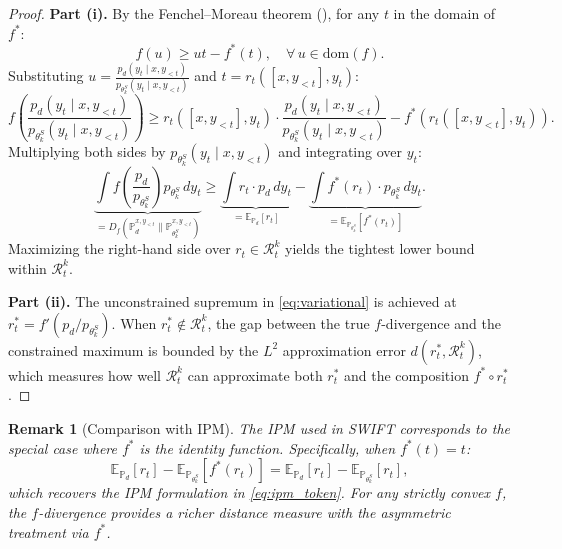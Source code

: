\documentclass[11pt,a4paper]{article}
\newtheorem{remark}[theorem]{Remark}
\newcommand{\Pd}{\mathbb{P}_d}
\newcommand{\E}{\mathbb{E}}
\newcommand{\Df}{D_f}
\begin{document}
\begin{proof}
\textbf{Part (i).} By the Fenchel--Moreau theorem (), for any $t$ in the domain of $f^*$:
\begin{equation}
    f(u) \geq ut - f^*(t), \quad \forall\, u \in \mathrm{dom}(f).
    \label{eq:fenchel_ineq}
\end{equation}
Substituting $u = \frac{p_d(y_t \mid x, y_{<t})}{p_{\theta^S_k}(y_t \mid x, y_{<t})}$ and $t = r_t([x, y_{<t}], y_t)$:
\[
    f\!\left(\frac{p_d(y_t \mid x, y_{<t})}{p_{\theta^S_k}(y_t \mid x, y_{<t})}\right) \geq r_t([x, y_{<t}], y_t) \cdot \frac{p_d(y_t \mid x, y_{<t})}{p_{\theta^S_k}(y_t \mid x, y_{<t})} - f^*\!\left(r_t([x, y_{<t}], y_t)\right).
\]
Multiplying both sides by $p_{\theta^S_k}(y_t \mid x, y_{<t})$ and integrating over $y_t$:
\[
    \underbrace{\int f\!\left(\frac{p_d}{p_{\theta^S_k}}\right) p_{\theta^S_k}\, dy_t}_{= \Df(\Pd^{x,y_{<t}} \| \mathbb{P}_{\theta^S_k}^{x,y_{<t}})} \geq \underbrace{\int r_t \cdot p_d\, dy_t}_{= \E_{\Pd}[r_t]} - \underbrace{\int f^*(r_t) \cdot p_{\theta^S_k}\, dy_t}_{= \E_{\mathbb{P}_{\theta^S_k}}[f^*(r_t)]}.
\]
Maximizing the right-hand side over $r_t \in \mathcal{R}_t^k$ yields the tightest lower bound within $\mathcal{R}_t^k$.

\textbf{Part (ii).} The unconstrained supremum in \eqref{eq:variational} is achieved at $r_t^* = f'(p_d / p_{\theta^S_k})$. When $r_t^* \notin \mathcal{R}_t^k$, the gap between the true $f$-divergence and the constrained maximum is bounded by the $L^2$ approximation error $d(r_t^*, \mathcal{R}_t^k)$, which measures how well $\mathcal{R}_t^k$ can approximate both $r_t^*$ and the composition $f^* \circ r_t^*$.
\end{proof}

\begin{remark}[Comparison with IPM]
\label{rem:ipm_comparison}
The IPM used in SWIFT corresponds to the special case where $f^*$ is the identity function. Specifically, when $f^*(t) = t$:
\begin{equation}
    \E_{\Pd}[r_t] - \E_{\mathbb{P}_{\theta^S_k}}[f^*(r_t)] = \E_{\Pd}[r_t] - \E_{\mathbb{P}_{\theta^S_k}}[r_t],
\end{equation}
which recovers the IPM formulation in \eqref{eq:ipm_token}. For any strictly convex $f$, the $f$-divergence provides a richer distance measure with the asymmetric treatment via $f^*$.
\end{remark}
\end{document}
